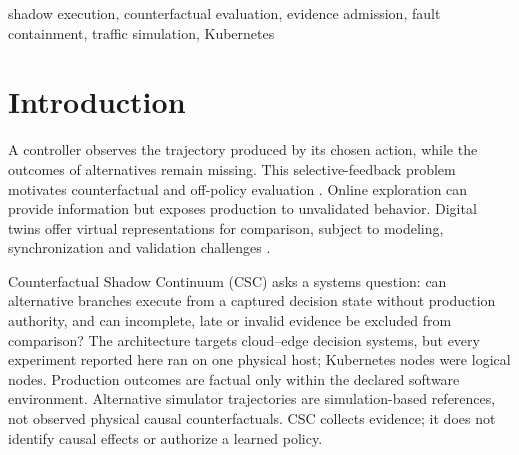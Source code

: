 \documentclass[conference,letterpaper]{IEEEtran}
\begin{document}
\begin{abstract}
Decision systems observe chosen actions while alternatives remain unobserved.
Counterfactual Shadow Continuum (CSC) separates authoritative production from a
same-action mirror and non-actuating alternative branches. State anchors and
bounded evidence admission support comparison without transferring actuation
authority. We evaluated runtime behavior, Kubernetes containment and
forecast-only estimates against Simulation of Urban MObility (SUMO), all on one
physical host. Across 864 execution configurations and six seed clusters,
alternative queue mean absolute error was 2.029 vehicles versus 3.841 for a
stationary persistence baseline, a 47.18\% reduction. Best-action agreement was
0.778 (77.78\%), versus 0.222 for persistence. The predictor uses arrival
forecasts and calibration; the baseline ignores both, so this accuracy difference
is not an effect of branching or mirrors. An infrastructure pilot completed 120
requests. Complete evidence collapsed under added shadow delay, the continuous
study was not executed, and memory containment remained inconclusive after the
observer was killed. These results demonstrate bounded execution and simulator
comparisons. Limited replication, incomplete containment and the absence of
physical counterfactual observations restrict their use for operational decisions;
learning and policy promotion remain blocked.
\end{abstract}

\begin{IEEEkeywords}
shadow execution, counterfactual evaluation, evidence admission, fault containment,
traffic simulation, Kubernetes
\end{IEEEkeywords}

\section{Introduction}
A controller observes the trajectory produced by its chosen action, while the
outcomes of alternatives remain missing. This selective-feedback problem
motivates counterfactual and off-policy evaluation
\cite{bottou2013counterfactual,li2011unbiased,wang2017optimal}. Online exploration
can provide information but exposes production to unvalidated behavior. Digital
twins offer virtual representations for comparison, subject to modeling,
synchronization and validation challenges \cite{tao2019digital,fuller2020digital}.

Counterfactual Shadow Continuum (CSC) asks a systems question: can alternative
branches execute from a captured decision state without production authority,
and can incomplete, late or invalid evidence be excluded from comparison?
The architecture targets cloud--edge decision systems, but every experiment
reported here ran on one physical host; Kubernetes nodes were logical nodes.
Production outcomes are factual only within the declared software environment.
Alternative simulator trajectories are simulation-based references, not observed
physical causal counterfactuals. CSC collects evidence; it does not identify
causal effects or authorize a learned policy.
\end{document}
